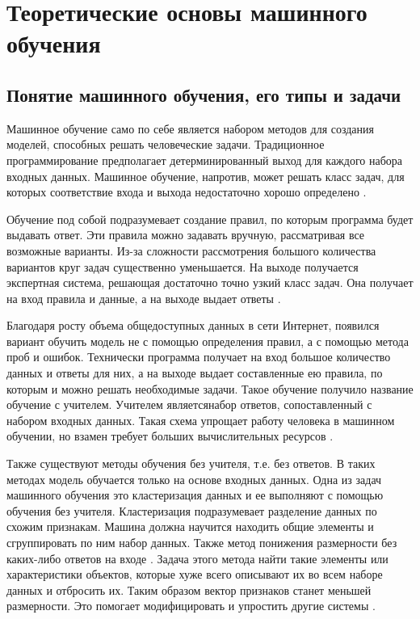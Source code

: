 \chapter{Теоретические основы машинного обучения}
\section{Понятие машинного обучения, его типы и задачи}


Машинное обучение само по себе является набором методов для создания моделей, способных решать человеческие задачи. Традиционное программирование предполагает детерминированный выход для каждого набора входных данных. Машинное обучение, напротив, может решать класс задач, для которых соответствие входа и выхода недостаточно хорошо определено \cite{15,22}. 

Обучение под собой подразумевает создание правил, по которым программа будет выдавать ответ. Эти правила можно задавать вручную, рассматривая все возможные варианты. Из-за сложности рассмотрения большого количества вариантов круг задач существенно уменьшается. На выходе получается экспертная система, решающая достаточно точно узкий класс задач. Она получает на вход правила и данные, а на выходе выдает ответы \cite{16,27}.

Благодаря росту объема общедоступных данных в сети Интернет, появился вариант обучить модель не с помощью определения правил, а с помощью метода проб и ошибок. Технически программа получает на вход большое количество данных и ответы для них, а на выходе выдает составленные ею правила, по которым и можно решать необходимые задачи. Такое обучение получило название обучение с учителем. Учителем являетсянабор ответов, сопоставленный с набором входных данных. Такая схема упрощает работу человека в машинном обучении, но взамен требует больших вычислительных ресурсов \cite{13}. 

Также существуют методы обучения без учителя, т.е. без ответов. В таких методах модель обучается только на основе входных данных. Одна из задач машинного обучения это кластеризация данных и ее выполняют с помощью обучения без учителя. Кластеризация подразумевает разделение данных по схожим признакам. Машина должна научится находить общие элементы и сгруппировать по ним набор данных. Также метод понижения размерности без каких-либо ответов на входе \cite{19,26}. Задача этого метода найти такие элементы или характеристики объектов, которые хуже всего описывают их во всем наборе данных и отбросить их. Таким образом вектор признаков станет меньшей размерности. Это помогает модифицировать и упростить другие системы \cite{12,23}. 


